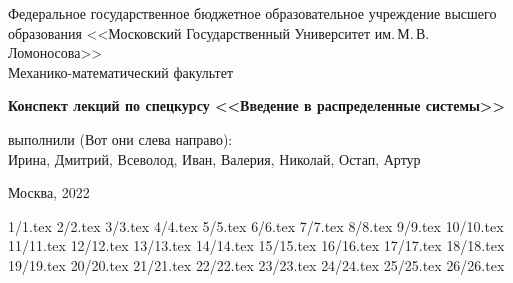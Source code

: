 \documentclass[specialist, subf, href, colorlinks=true, 14pt, times, mtpro, final]{disser}
\theoremstyle{definition}
\begin{document}
\begin{titlepage}
	\begin{center}
		
		Федеральное государственное бюджетное образовательное учреждение высшего образования 
		<<Московский Государственный Университет им.\,М.\,В.\,Ломоносова>>\\
		
		\vspace{9cm}
		Механико-математический факультет
		
		{\bf Конспект лекций по спецкурсу <<Введение в распределенные системы>>}
		
		\vspace{9cm}
		\begin{flushright}
			{ выполнили (Вот они слева направо):}\\
			Ирина, Дмитрий, Всеволод, Иван, Валерия, Николай, Остап, Артур\\[0.5cm]
		\end{flushright}
		\vspace{1cm}
		
		\normalsize Москва, 2022
	\end{center}
\end{titlepage}

	
\tableofcontents
	
 {1/1.tex}
 {2/2.tex}
 {3/3.tex}
 {4/4.tex}
 {5/5.tex}
 {6/6.tex}
 {7/7.tex}
 {8/8.tex}
 {9/9.tex}
 {10/10.tex}
 {11/11.tex}
 {12/12.tex}
 {13/13.tex}
 {14/14.tex}
 {15/15.tex}
 {16/16.tex}
 {17/17.tex}
 {18/18.tex}
 {19/19.tex}
 {20/20.tex}
 {21/21.tex}
 {22/22.tex}
 {23/23.tex}
 {24/24.tex}
 {25/25.tex}
 {26/26.tex}
\end{document}
